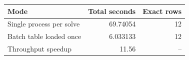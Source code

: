 {\small
\begin{tabular}{lrr}
\hline
Mode & Total seconds & Exact rows \\
\hline
Single process per solve & 69.74054 & 12 \\
Batch table loaded once & 6.033133 & 12 \\
Throughput speedup & 11.56 & -- \\
\hline
\end{tabular}
}
